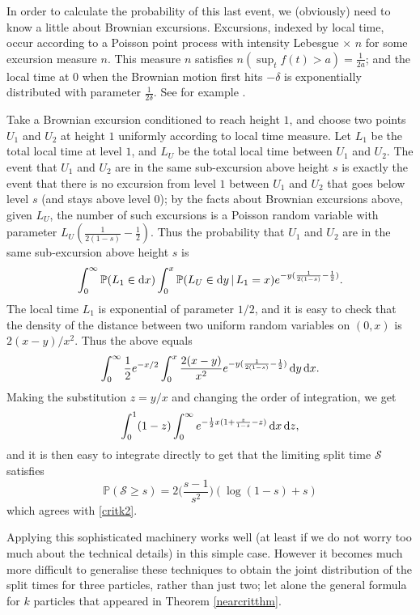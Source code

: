 \documentclass{article}
\theoremstyle{plain}
\theoremstyle{definition}
\renewcommand{\P}{\mathbb{P}}
\renewcommand{\d}{{\rm{d}}}
\renewcommand{\S}{\mathcal{S}}
\begin{document}
In order to calculate the probability of this last event, we (obviously) need to know a little about Brownian excursions. Excursions, indexed by local time, occur according to a Poisson point process with intensity Lebesgue $\times\,\, n$ for some excursion measure $n$. This measure $n$ satisfies $n(\sup_t f(t)>a ) = \frac{1}{2a}$; and the local time at $0$ when the Brownian motion first hits $-\delta$ is exponentially distributed with parameter $\frac{1}{2\delta}$. See for example \cite{rogers:guided_tour_excursions}.

Take a Brownian excursion conditioned to reach height $1$, and choose two points $U_1$ and $U_2$ at height $1$ uniformly according to local time measure. Let $L_1$ be the total local time at level $1$, and $L_U$ be the total local time between $U_1$ and $U_2$. The event that $U_1$ and $U_2$ are in the same sub-excursion above height $s$ is exactly the event that there is no excursion from level $1$ between $U_1$ and $U_2$ that goes below level $s$ (and stays above level $0$); by the facts about Brownian excursions above, given $L_U$, the number of such excursions is a Poisson random variable with parameter $L_U(\frac{1}{2(1-s)} - \frac{1}{2})$. Thus the probability that $U_1$ and $U_2$ are in the same sub-excursion above height $s$ is
\[\int_0^\infty \P(L_1 \in \d x) \int_0^x \P( L_U \in \d y \,|\, L_1 = x) e^{-y(\frac{1}{2(1-s)}-\frac{1}{2})}.\]
The local time $L_1$ is exponential of parameter $1/2$, and it is easy to check that the density of the distance between two uniform random variables on $(0,x)$ is $2(x-y)/x^2$. Thus the above equals
\[\int_0^\infty \frac{1}{2} e^{-x/2} \int_0^x \frac{2(x-y)}{x^2} e^{-y(\frac{1}{2(1-s)}-\frac{1}{2})}\, \d y\, \d x.\]
Making the substitution $z=y/x$ and changing the order of integration, we get
\[\int_0^1 (1-z) \int_0^\infty e^{-\frac12 x (1+\frac{z}{1-s}-z)}\,\d x\,\d z,\]
and it is then easy to integrate directly to get that the limiting split time $\S$ satisfies
\[\P(\S\ge s) = 2\Big(\frac{s-1}{s^2}\Big)(\log(1-s)+s)\]
which agrees with \eqref{critk2}.

Applying this sophisticated machinery works well (at least if we do not worry too much about the technical details) in this simple case. However it becomes much more difficult to generalise these techniques to obtain the joint distribution of the split times for three particles, rather than just two; let alone the general formula for $k$ particles that appeared in Theorem \ref{nearcritthm}.
\end{document}
